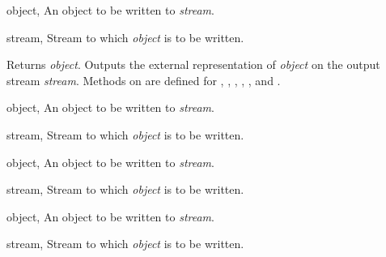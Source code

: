 \begin{optDefinition}
\begin{genericargs}
    \item[object, \classref{object}] An object to be written to {\em stream}.
    \item[stream, \classref{stream}] Stream to which {\em object\/} is to be written.
\end{genericargs}
%
\result%
Returns {\em object}.
%
\remarks%
Outputs the external representation of {\em object\/} on the output stream
{\em stream}.
%
\seealso%
Methods on  are defined for
, , ,
, ,  and .

\begin{specargs}
    \item[object, \classref{object}] An object to be written to {\em stream}.
    \item[stream, \classref{stream}] Stream to which {\em object\/} is to be written.
\end{specargs}

\begin{specargs}
    \item[object, \classref{object}] An object to be written to {\em stream}.
    \item[stream, \classref{buffered-stream}] Stream to which {\em object\/} is
    to be written.
\end{specargs}

\begin{specargs}
    \item[object, \classref{object}] An object to be written to {\em stream}.
    \item[stream, \classref{file-stream}] Stream to which {\em object\/} is
    to be written.
\end{specargs}


\end{optDefinition}
